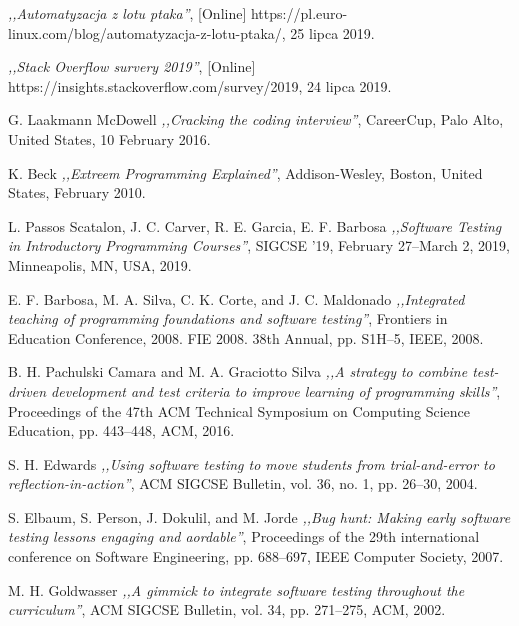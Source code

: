 \begin{thebibliography}{99}
 \emph{,,Automatyzacja z lotu ptaka''}, [Online] https://pl.euro-linux.com/blog/automatyzacja-z-lotu-ptaka/, 25 lipca 2019.

 \emph{,,Stack Overflow survery 2019''}, [Online] https://insights.stackoverflow.com/survey/2019, 24 lipca 2019.

 G. Laakmann McDowell \emph{,,Cracking the coding interview''}, CareerCup, Palo Alto, United States, 10 February 2016.

 K. Beck \emph{,,Extreem Programming Explained''}, Addison-Wesley, Boston, United States, February 2010.

 L. Passos Scatalon, J. C. Carver, R. E. Garcia, E. F. Barbosa \emph{,,Software Testing in Introductory Programming Courses''}, SIGCSE '19, February 27–March 2, 2019, Minneapolis, MN, USA, 2019.

 E. F. Barbosa, M. A. Silva, C. K. Corte, and J. C. Maldonado \emph{,,Integrated teaching of programming foundations and software testing''}, Frontiers in Education Conference, 2008. FIE 2008. 38th Annual, pp. S1H–5, IEEE, 2008.

 B. H. Pachulski Camara and M. A. Graciotto Silva \emph{,,A strategy to combine test-driven development and test criteria to improve learning of programming skills''}, Proceedings of the 47th ACM Technical Symposium on Computing Science Education, pp. 443–448, ACM, 2016.

 S. H. Edwards  \emph{,,Using software testing to move students from trial-and-error to reflection-in-action''}, ACM SIGCSE Bulletin, vol. 36, no. 1, pp. 26–30, 2004.

 S. Elbaum, S. Person, J. Dokulil, and M. Jorde \emph{,,Bug hunt: Making early software testing lessons engaging and aordable''}, Proceedings of the 29th international conference on Software Engineering, pp. 688–697, IEEE Computer Society, 2007.

 M. H. Goldwasser \emph{,,A gimmick to integrate software testing throughout the curriculum''}, ACM SIGCSE Bulletin, vol. 34, pp. 271–275, ACM, 2002.


\end{thebibliography}
